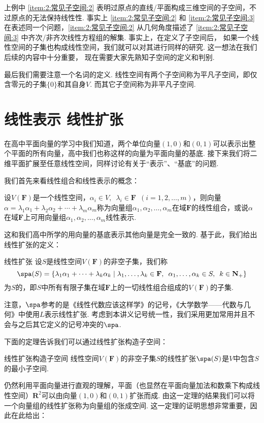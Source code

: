 上例中 \ref*{item:2:常见子空间:2} 表明过原点的直线/平面构成三维空间的子空间，不过原点的无法保持线性性. 事实上 \ref*{item:2:常见子空间:2} 和 \ref*{item:2:常见子空间:3} 在表述同一个问题，\ref*{item:2:常见子空间:2} 从几何角度描述了 \ref*{item:2:常见子空间:3} 中齐次/非齐次线性方程组的解集. 事实上，在定义了子空间后， 如果一个线性空间的子集也构成线性空间，我们就可以对其进行同样的研究. 这一想法在我们后续的内容中十分重要， 现在需要大家先熟知子空间的定义和判别.

最后我们需要注意一个名词的定义. 线性空间有两个子空间称为平凡子空间，即仅含零元的子集$\{0\}$和其自身$V$. 而其它子空间称为非平凡子空间.

\section{线性表示 \quad 线性扩张}

在高中平面向量的学习中我们知道，两个单位向量$(1,0)$和$(0,1)$可以表示出整个平面的所有向量，高中我们也称这样的向量为平面向量的基底. 接下来我们将二维平面扩展至任意线性空间，同样讨论有关于``表示''、``基底''的问题.

我们首先来看线性组合和线性表示的概念：
\begin{definition}{}{}
    设$V(\mathbf{F})$是一个线性空间，$\alpha_i\in V,\enspace\lambda_i\in \mathbf{F}\enspace(i=1,2,\ldots,m)$，则向量$\alpha=\lambda_1\alpha_1+\lambda_2\alpha_2+\cdots+\lambda_m\alpha_m$称为向量组$\alpha_1,\alpha_2,\ldots,\alpha_m$在域$\mathbf{F}$的线性组合，或说$\alpha$在域$\mathbf{F}$上可用向量组$\alpha_1,\alpha_2,\ldots,\alpha_m$线性表示.
\end{definition}
这和我们高中所学的用向量的基底表示其他向量是完全一致的. 基于此，我们给出线性扩张的定义：
\begin{definition}{线性扩张}{} 
    设$S$是线性空间$V(\mathbf{F})$的非空子集，我们称
    \[ \spa(S)=\{\lambda_1\alpha_1+\cdots+\lambda_k\alpha_k \mid \lambda_1,\ldots,\lambda_k\in\mathbf{F},\enspace\alpha_1,\ldots,\alpha_k\in S,\enspace k\in\mathbf{N}_+\} \]
    为$S$的，即$S$中所有有限子集在域$\mathbf{F}$上的一切线性组合组成的$V(\mathbf{F})$的子集.
\end{definition}
注意，$\spa$参考的是《线性代数应该这样学》的记号，《大学数学——代数与几何》中使用$L$表示线性扩张. 考虑到本讲义记号统一性，我们采用更加常用并且不会与之后其它定义的记号冲突的$\spa$.

下面的定理告诉我们可以通过线性扩张构造子空间：
\begin{theorem}{}{线性扩张构造子空间}
    线性空间$V(\mathbf{F})$的非空子集$S$的线性扩张$\spa(S)$是$V$中包含$S$的最小子空间.
\end{theorem}
仍然利用平面向量进行直观的理解，平面（也显然在平面向量加法和数乘下构成线性空间）$\mathbf{R}^2$可以由向量$(1,0)$和$(0,1)$扩张而成. 由这一定理的结果我们可以将一个向量组的线性扩张称为向量组的张成空间. 这一定理的证明思想非常重要，因此在此给出：

